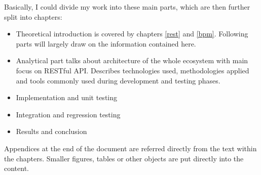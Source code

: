 \begin{introduction}
	Basically, I could divide my work into these main parts, which are then further split into chapters:
	
	\begin{itemize}
	  \item Theoretical introduction is covered by chapters \ref{rest} and \ref{bpm}. Following parts will largely draw on
	  the information contained here.
	  \item Analytical part talks about architecture of the whole ecosystem with main focus on RESTful \gls{API}.
	  Describes technologies used, methodologies applied and tools commonly used during development and testing phases.
	  \item Implementation and unit testing
	  \item Integration and regression testing
	  \item Results and conclusion
	\end{itemize}
	
	Appendices at the end of the document are referred directly from the text within the chapters. Smaller figures, tables
	or other objects are put directly into the content.
	 
\end{introduction}